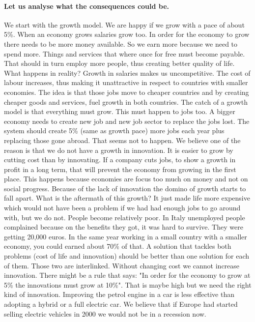 \documentclass{article}
\begin{document}
\paragraph{Let us analyse what the consequences could be.}
We start with the growth model.
We are happy if we grow with a pace of about 5\%.
When an economy grows salaries grow too.
In order for the economy to grow there needs to be more money available.
So we earn more because we need to spend more.
Things and services that where once for free must become payable.
That should in turn employ more people, thus creating better quality of life.
What happens in reality?
Growth in salaries makes us uncompetitive.
The cost of labour increases, thus making it unattractive in respect to countries with smaller economies.
The idea is that those jobs move to cheaper countries and by creating cheaper goods and services, fuel growth in both countries.
The catch of a growth model is that everything must grow.
This must happen to jobs too.
A bigger economy needs to create new job and new job sector to replace the jobs lost.
The system should create 5\% (same as growth pace) more jobs each year plus replacing those gone abroad.
That seems not to happen.
We believe one of the reason is that we do not have a growth in innovation.
It is easier to grow by cutting cost than by innovating.
If a company cuts jobs, to show a growth in profit in a long term, that will prevent the economy from growing in the first place.
This happens because economies are focus too much on money and not on social progress.
Because of the lack of innovation the domino of growth starts to fall apart.
What is the aftermath of this growth?
It just made life more expensive which would not have been a problem if we had had enough jobs to go around with, but we do not.
People become relatively poor.
In Italy unemployed people complained because on the benefits they got, it was hard to survive.
They were getting 20,000 euros.
In the same year working in a small country with a smaller economy, you could earned about 70\% of that.
A solution that tackles both problems (cost of life and innovation) should be better than one solution for each of them.
Those two are interlinked.
Without changing cost we cannot increase innovation.
There might be a rule that says: "In order for the economy to grow at 5\% the innovations must grow at 10\%".
That is maybe high but we need the right kind of innovation.
Improving the petrol engine in a car is less effective than adopting a hybrid or a full electric car. 
We believe that if Europe had started selling electric vehicles in 2000 we would not be in a recession now.
\end{document}
